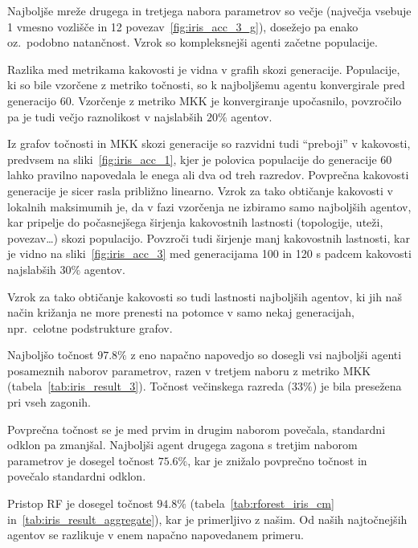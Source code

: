 \documentclass[a4paper,12pt,openright]{book}
\begin{document}
    Najboljše mreže drugega in tretjega nabora parametrov so večje (največja vsebuje 1 vmesno vozlišče in 12 povezav~\ref{fig:iris_acc_3_g}),
    dosežejo pa enako oz.\ podobno natančnost.
    Vzrok so kompleksnejši agenti začetne populacije.

    Razlika med metrikama kakovosti je vidna v grafih skozi generacije.
    Populacije, ki so bile vzorčene z metriko točnosti, so k najboljšemu agentu konvergirale pred generacijo 60.
    Vzorčenje z metriko MKK je konvergiranje upočasnilo, povzročilo pa je tudi večjo raznolikost v najslabših $20\%$ agentov.

    Iz grafov točnosti in MKK skozi generacije so razvidni tudi \enquote{preboji} v kakovosti, predvsem na sliki~\ref{fig:iris_acc_1},
    kjer je polovica populacije do generacije 60 lahko pravilno napovedala le enega ali dva od treh razredov.
    Povprečna kakovosti generacije je sicer rasla približno linearno.
    Vzrok za tako obtičanje kakovosti v lokalnih maksimumih je, da v fazi vzorčenja ne izbiramo samo najboljših agentov,
    kar pripelje do počasnejšega širjenja kakovostnih lastnosti (topologije, uteži, povezav\ldots) skozi populacijo.
    Povzroči tudi širjenje manj kakovostnih lastnosti, kar je vidno na sliki~\ref{fig:iris_acc_3} med generacijama 100 in
    120 s padcem kakovosti najslabših $30\%$ agentov.

    Vzrok za tako obtičanje kakovosti so tudi lastnosti najboljših agentov, ki jih naš način križanja ne more prenesti
    na potomce v samo nekaj generacijah, npr.\ celotne podstrukture grafov.

    Najboljšo točnost $97.8\%$ z eno napačno napovedjo so dosegli vsi najboljši agenti posameznih naborov parametrov, razen v tretjem naboru z
    metriko MKK (tabela~\ref{tab:iris_result_3}).
    Točnost večinskega razreda ($33\%$) je bila presežena pri vseh zagonih.

    Povprečna točnost se je med prvim in drugim naborom povečala, standardni odklon pa zmanjšal.
    Najboljši agent drugega zagona s tretjim naborom parametrov je dosegel točnost $75.6\%$, kar je znižalo povprečno točnost
    in povečalo standardni odklon.

    Pristop RF je dosegel točnost $94.8\%$ (tabela~\ref{tab:rforest_iris_cm} in~\ref{tab:iris_result_aggregate}), kar je
    primerljivo z našim.
    Od naših najtočnejših agentov se razlikuje v enem napačno napovedanem primeru.
\end{document}
